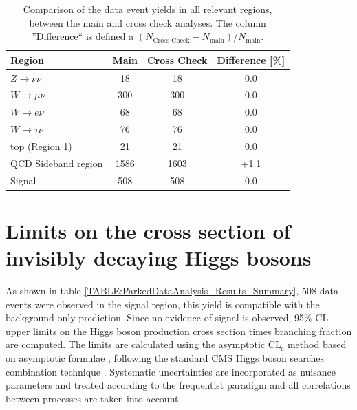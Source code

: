 \begin{table}[!htb]
\centering
\begin{tabular}{|l|c|c|c|}
\hline
Region                & Main & Cross Check & Difference [\%] \\
\hline\hline
$Z\rightarrow\nu\nu$  &   18 &          18 &             0.0 \\
$W\rightarrow\mu\nu$  &  300 &         300 &             0.0 \\
$W\rightarrow e\nu$   &   68 &          68 &             0.0 \\
$W\rightarrow\tau\nu$ &   76 &          76 &             0.0 \\
top (Region 1)        &   21 &          21 &             0.0 \\
QCD Sideband region   & 1586 &        1603 &            +1.1 \\
\hline\hline
Signal                &  508 &         508 &             0.0 \\
\hline
\end{tabular}
\caption{Comparison of the data event yields in all relevant regions, between the main and cross check analyses. The column ''Difference`` is defined a $(N_{\text{Cross Check}}-N_{\text{main}})/N_{\text{main}}$.}
\label{TABLE:ParkedDataAnalysis_Results_MainCrossCheckComparison}
\end{table}

\section{Limits on the cross section of invisibly decaying Higgs bosons}
\label{SECTION:ParkedDataAnalysis_Limits}


As shown in table \ref{TABLE:ParkedDataAnalysis_Results_Summary}, 508 data events were observed in the signal region, this yield is compatible with the background-only prediction. Since no evidence of signal is observed, 95\% \gls{CL} upper limits on the Higgs boson production cross section times branching fraction are computed. The limits are calculated using the asymptotic $\mathrm{CL}_\mathrm{s}$ method \cite{ARTICLE:CLsTechnique,ARTICLE:CLCompForCombiningSearchesWithSmallStat,ARTICLE:HandbookofLHCHiggsCrossSectionsDifferentialDistributions} based on asymptotic formulae \cite{ARTICLE:AsymptoticCLS}, following the standard \gls{CMS} Higgs boson searches combination technique \cite{ARTICLE:CMS_HiggsDiscovery,ARTICLE:HiggsCombination}. Systematic uncertainties are incorporated as nuisance parameters and treated according to the frequentist paradigm \cite{ARTICLE:HiggsCombination} and all correlations between processes are taken into account.

